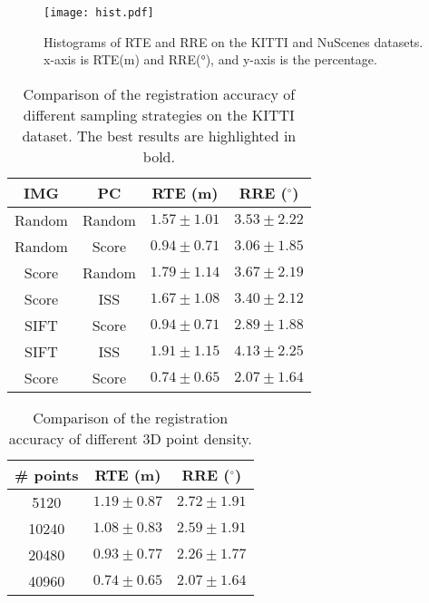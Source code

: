 \documentclass[lettersize,journal]{IEEEtran}
\begin{document}
\begin{figure}[h]
\centering
\texttt{[image: hist.pdf]}
\caption{Histograms of RTE and RRE on the KITTI and NuScenes datasets. x-axis is RTE(m) and RRE(°), and y-axis is the percentage.}
\label{FIG8}
\end{figure}

\begin{table}[t]
    \centering
    \renewcommand\arraystretch{1.5}
    \caption{Comparison of the registration accuracy of different sampling strategies on the KITTI dataset. The best results are highlighted in bold.}
\begin{tabular}{c|c|c|c}
    \hline\hline
      IMG & PC & RTE (m) & RRE ($^{\circ}$) \\
    \hline
    Random & Random   & $1.57\pm 1.01$ & $3.53\pm 2.22$ \\
    \hline
    Random & Score  & $0.94\pm 0.71$ & $3.06\pm 1.85$ \\
    \hline
    Score & Random & $1.79\pm 1.14$ & $3.67\pm 2.19$ \\
    \hline
    Score & ISS  & $1.67\pm1.08$ & $3.40\pm2.12$  \\
    \hline
    SIFT & Score & $0.94\pm0.71$ & $2.89\pm1.88$\\
    \hline
    SIFT & ISS &$1.91\pm1.15$ &$4.13\pm2.25$\\
    \hline
    Score & Score& $\pmb{0.74\pm0.65}$ & $\pmb{2.07\pm1.64}$ \\
    \hline\hline
    \end{tabular} \label{TAB2}
\end{table}

\begin{table}[t]
    \centering
    \renewcommand\arraystretch{1.5}
    \caption{Comparison of the registration accuracy of different 3D point density.}
\begin{tabular}{c|c|c}
    \hline\hline
      \# points & RTE (m) & RRE ($^{\circ}$) \\
    \hline
    5120    & $1.19\pm 0.87$ & $2.72\pm 1.91$ \\
    \hline
    10240   & $1.08\pm 0.83$ & $2.59\pm 1.91$ \\
    \hline
    20480  & $0.93\pm 0.77$ & $2.26\pm 1.77$ \\
    \hline
    40960   & $0.74\pm0.65$ & $2.07\pm1.64$  \\
    \hline\hline
    \end{tabular} \label{TAB3}
\end{table}
\end{document}
